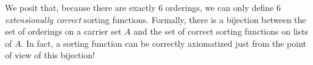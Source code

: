 We posit that, because there are exactly 6 orderings, we can only define 6 \emph{extensionally correct} sorting functions.
%
Formally, there is a bijection between the set of orderings on a carrier set $A$ and the set of correct sorting
functions on lists of $A$.
%
In fact, a sorting function can be correctly axiomatized just from the point of view of this bijection!









